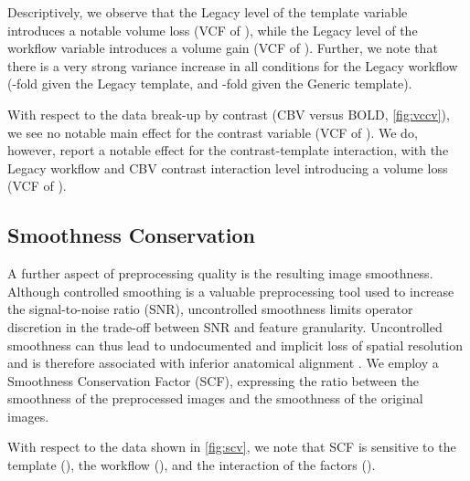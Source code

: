 Descriptively, we observe that the Legacy level of the template variable introduces a notable volume loss
(VCF of ),
while the Legacy level of the workflow variable introduces a volume gain
(VCF of ).
Further, we note that there is a very strong variance increase in all conditions for the Legacy workflow
(-fold given the Legacy template, and -fold given the Generic template).

With respect to the data break-up by contrast (CBV versus BOLD, \cref{fig:vccv}), we see no notable main effect for the contrast variable
(VCF of ).
We do, however, report a notable effect for the contrast-template interaction, with the Legacy workflow and CBV contrast interaction level introducing a volume loss
(VCF of ).


\subsection{Smoothness Conservation}

A further aspect of preprocessing quality is the resulting image smoothness.
Although controlled smoothing is a valuable preprocessing tool used to increase the signal-to-noise ratio (SNR), uncontrolled smoothness limits operator discretion in the trade-off between SNR and feature granularity.
Uncontrolled smoothness can thus lead to undocumented and implicit loss of spatial resolution and is therefore associated with inferior anatomical alignment \cite{fmriprep}.
We employ a Smoothness Conservation Factor (SCF), expressing the ratio between the smoothness of the preprocessed images and the smoothness of the original images.

With respect to the data shown in \cref{fig:scv}, we note that SCF is sensitive to
the template (),
the workflow (),
and the interaction of the factors ().

